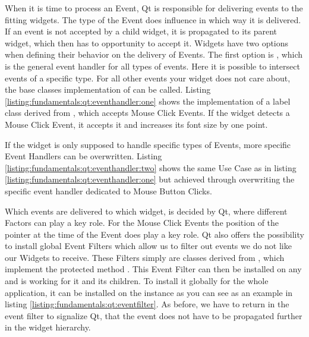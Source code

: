 When it is time to process an Event, Qt is responsible for delivering events to
the fitting widgets. The type of the Event does influence in which way it is
delivered. If an event is not accepted by a child widget, it is propagated to
its parent widget, which then has to opportunity to accept it. Widgets have two
options when defining their behavior on the delivery of Events.  The first
option is , which is the general
event handler for all types of events. Here it is possible to intersect events
of a specific type. For all other events your widget does not care about, the
base classes implementation of  can be called.
Listing \ref{listing:fundamentals:qt:eventhandler:one} shows the implementation
of a label class derived from , which
accepts Mouse Click Events. If the widget detects a Mouse Click Event, it
accepts it and increases its font size by one point.



If the widget is only supposed to handle specific types of Events, more specific
Event Handlers can be overwritten. Listing
\ref{listing:fundamentals:qt:eventhandler:two} shows the same Use Case as in
listing \ref{listing:fundamentals:qt:eventhandler:one} but achieved through
overwriting the specific event handler dedicated to Mouse Button Clicks.



Which events are delivered to which widget, is decided by Qt, where different
Factors can play a key role. For the Mouse Click Events the position of the
pointer at the time of the Event does play a key role. Qt also offers the
possibility to install global Event Filters which allow us to filter out events
we do not like our Widgets to receive. These Filters simply are classes derived
from , which implement the protected method
. This Event
Filter can then be installed on any  and is
working for it and its children. To install it globally for the whole
application, it can be installed on the
 instance as you can see as an example
in listing \ref{listing:fundamentals:qt:eventfilter}. As before, we have to
return  in the event filter to signalize Qt, that the
event does not have to be propagated further in the widget hierarchy.

